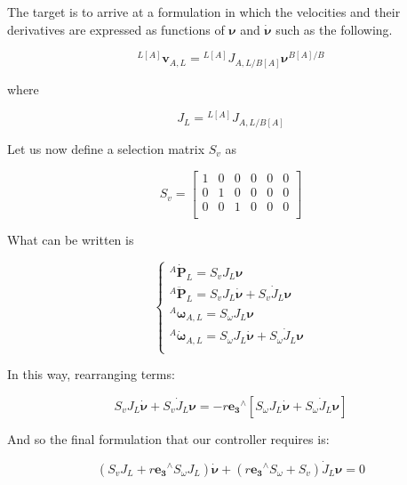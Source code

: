 The target is to arrive at a formulation in which the velocities and their derivatives are expressed as functions of $\bm{\nu}$ and $\dot{\bm{\nu}}$ such as the following.

\begin{equation}
{}^{L[A]}  \mathbf{v}_{A,L} = {}^{L[A]} J_{A,L/B[A]} \bm{\nu}^{B[A]/B}
\label{eq: wheel center velocity}
\end{equation}

where 

\begin{equation*}
    J_{L} =  {}^{L[A]} J_{A,L/B[A]}
\end{equation*}

Let us now define a selection matrix $S_{v}$ as

\begin{equation*}
 S_{v} = \begin{bmatrix}
 1 & 0 & 0 & 0 & 0 & 0 \\
 0 & 1 & 0 & 0 & 0 & 0 \\
 0 & 0 & 1 & 0 & 0 & 0 \\
\end{bmatrix}
\end{equation*}

What can be written is

$$  \begin{cases}
{}^{A} \dot{\mathbf{P}}_{L} = S_{v} J_{L}\bm{\nu} \\
{}^{A} \ddot{\mathbf{P}}_{L} = S_v J_{L}\dot{\bm{\nu}} + S_{v} \dot{J}_{L}\bm{\nu} \\
{}^{A} \bm{\omega}_{A,L} = S_{\omega} J_{L}\bm{\nu} \\
{}^{A} \dot{\bm{\omega}}_{A,L} = S_{\omega} J_L\dot{\bm{\nu}} + S_{\omega}  \dot{J}_{L} \bm{\nu} \\
\end{cases}$$

In this way, rearranging terms:

$$
S_{v} J_{L}\dot{\bm{\nu}} +  S_{v} \dot{J}_{L}\bm{\nu} = -r\mathbf{e_{3}}^{\wedge{}}[S_{\omega} J_{L}\dot{\bm{\nu}} + S_{\omega}  \dot{J}_{L} \bm{\nu}]$$ 

And so the final formulation that our controller requires is:

\begin{equation*}
 (S_{v} J_{L} + r\mathbf{e_{3}}^{\wedge{}} S_{\omega} J_{L}) \dot{\bm{\nu}} + (r\mathbf{e_{3}}^{\wedge{}} S_{\omega} + S_{v}) \dot{J}_{L} \bm{\nu} = 0
\end{equation*}

